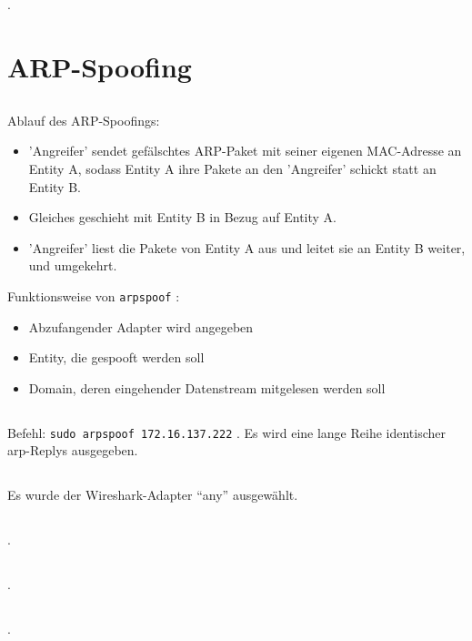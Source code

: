 \documentclass[twoside]{article}
\newcommand{\ttt}[1]{%
	\texttt{#1}%
}
\begin{document}
\subsection{}.


\section{ARP-Spoofing}
\subsection{}
Ablauf des ARP-Spoofings:
\begin{itemize}
	\item 'Angreifer' sendet gefälschtes ARP-Paket mit seiner eigenen MAC-Adresse an Entity A, sodass Entity A ihre Pakete an den 'Angreifer' schickt statt an Entity B.
	\item Gleiches geschieht mit Entity B in Bezug auf Entity A.
	\item 'Angreifer' liest die Pakete von Entity A aus und leitet sie an Entity B weiter, und umgekehrt.
\end{itemize}
Funktionsweise von \ttt{arpspoof}:
\begin{itemize}
	\item Abzufangender Adapter wird angegeben
	\item Entity, die gespooft werden soll
	\item Domain, deren eingehender Datenstream mitgelesen werden soll
\end{itemize}
\subsection{}
Befehl: \ttt{sudo arpspoof 172.16.137.222}.
Es wird eine lange Reihe identischer arp-Replys ausgegeben.
\subsection{}
Es wurde der Wireshark-Adapter ``any'' ausgewählt.
\subsection{}.
\subsection{}.
\subsection{}.
\end{document}
